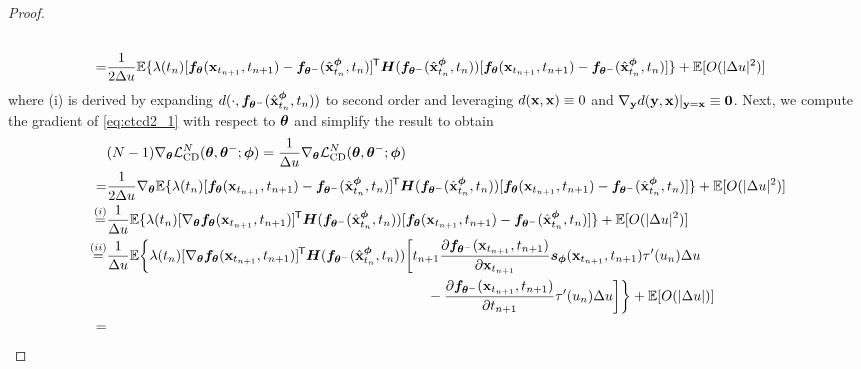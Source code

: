 \begin{appendices}
\begin{proof}
\begin{align}
\begin{multlined}[t][0.9\displaywidth]
        \end{multlined}\notag \\
        =&\frac{1}{2\Delta u}\mbb{E}\{\lambda(t_n)[\vf_\vtheta(\rvx_{t_{n+1}}, t_{n+1}) - \vf_{\vtheta^-}(\hat{\rvx}_{t_n}^\vphi, t_n)]\tran \mH(\vf_{\vtheta^{-}}(\hat{\rvx}_{t_n}^\vphi, t_n))[\vf_\vtheta(\rvx_{t_{n+1}}, t_{n+1}) - \vf_{\vtheta^-}(\hat{\rvx}_{t_n}^\vphi, t_n)]\} + \mbb{E}[O(|\Delta u|^2)]\label{eq:ctcd2_1}
    \end{align}
    where (i) is derived by expanding $d(\cdot, {\bm{f}}_{{\bm{\theta}}^{-}}(\hat{{\mathbf{x}}}_{t_n}^{\bm{\phi}}, t_n))$ to second order and leveraging $d({\mathbf{x}}, {\mathbf{x}}) \equiv 0$ and $\nabla_{\mathbf{y}} d({\mathbf{y}}, {\mathbf{x}})|_{{\mathbf{y}}={\mathbf{x}}} \equiv \bm{0}$. Next, we compute the gradient of \cref{eq:ctcd2_1} with respect to ${\bm{\theta}}$ and simplify the result to obtain
    \begin{align}
        &(N-1) \nabla_\vtheta \mcal{L}_\text{CD}^N(\vtheta, \vtheta^{-}; \vphi) = \frac{1}{\Delta u} \nabla_\vtheta \mcal{L}_\text{CD}^N(\vtheta, \vtheta^{-}; \vphi)\notag \\
        =&\frac{1}{2\Delta u} \nabla_\vtheta \mbb{E}\{\lambda(t_n)[\vf_\vtheta(\rvx_{t_{n+1}}, t_{n+1}) - \vf_{\vtheta^-}(\hat{\rvx}_{t_n}^\vphi, t_n)]\tran \mH(\vf_{\vtheta^{-}}(\hat{\rvx}_{t_n}^\vphi, t_n))[\vf_\vtheta(\rvx_{t_{n+1}}, t_{n+1}) - \vf_{\vtheta^-}(\hat{\rvx}_{t_n}^\vphi, t_n)]\} + \mbb{E}[O(|\Delta u|^2)]\notag \\
        \stackrel{(i)}{=}&\frac{1}{\Delta u} \mbb{E}\{\lambda(t_n)[\nabla_\vtheta \vf_\vtheta(\rvx_{t_{n+1}}, t_{n+1})]\tran \mH(\vf_{\vtheta^{-}}(\hat{\rvx}_{t_n}^\vphi, t_n))[\vf_\vtheta(\rvx_{t_{n+1}}, t_{n+1}) - \vf_{\vtheta^-}(\hat{\rvx}_{t_n}^\vphi, t_n)]\} + \mbb{E}[O(|\Delta u|^2)]\notag \\
        \stackrel{(ii)}{=}&\!\begin{multlined}[t][0.9\displaywidth]
                \frac{1}{\Delta u}\mbb{E}\bigg\{\lambda(t_n)[\nabla_\vtheta \vf_\vtheta(\rvx_{t_{n+1}}, t_{n+1})]\tran \mH(\vf_{\vtheta^{-}}(\hat{\rvx}_{t_n}^\vphi, t_n))\bigg[t_{n+1} \frac{\partial \vf_{\vtheta^-}(\rvx_{t_{n+1}}, t_{n+1})}{\partial \rvx_{t_{n+1}}}\vs_\vphi(\rvx_{t_{n+1}}, t_{n+1})\tau'(u_{n})\Delta u \\ - \frac{\partial \vf_{\vtheta^-}(\rvx_{t_{n+1}}, t_{n+1})}{\partial t_{n+1}}\tau'(u_{n})\Delta u\bigg]\bigg\} + \mbb{E}[O(|\Delta u|)]
            \end{multlined}\notag \\
        =&\!\begin{multlined}[t][0.9\displaywidth]

\end{multlined}
\end{align}
\end{proof}
\end{appendices}
